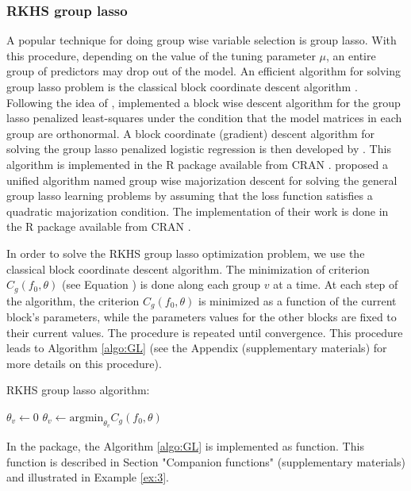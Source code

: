 \subsubsection{RKHS group lasso}\label{subsec:optimGL}
A popular technique for doing group wise variable selection is group lasso. With this procedure, depending on the value of the tuning parameter $\mu$, an entire group of predictors may drop out of the model. An efficient algorithm for solving group lasso problem is the classical block coordinate descent algorithm \citep{10.1561/2200000016,10.1561/2200000050}. Following the idea of \citet{10.2307/1390712}, \citet{doi:10.1111/j.1467-9868.2005.00532.x} implemented a block wise descent algorithm for the group lasso penalized least-squares under the condition that the model matrices in each group are orthonormal. A block coordinate (gradient) descent algorithm for solving the group lasso penalized logistic regression is then developed by \citet{MeiGeeBue08}. This algorithm is implemented in the R package  available from CRAN \citep{grppkg}. \citet{Yang:2015:FUA:2833490.2833520} proposed a unified algorithm named group wise majorization descent for solving the general group lasso learning problems by assuming that the loss function satisfies a quadratic majorization condition. The implementation of their work is done in the  R package available from CRAN \citep{gglspkg}. 

In order to solve the RKHS group lasso optimization problem, we use the classical block coordinate descent algorithm. The minimization of criterion $C_g(f_0,\theta)$ (see Equation ) is done along each group $v$ at a time. At each step of the algorithm, the criterion $C_g(f_0,\theta)$ is minimized as a function of the current block's parameters, while the parameters values for the other blocks are fixed to their current values. The procedure is repeated until convergence. This procedure leads to Algorithm \ref{algo:GL} (see the Appendix (supplementary materials) for more details on this procedure).
\begin{algorithm}[h!]
\caption{RKHS group lasso algorithm:}\label{algo:GL}
\small{
{\setlength{\tabcolsep}{4pt}
\begin{algorithmic}[1]
\Repeat
      \State $\theta_v\gets 0$
    \Else
      \State$\theta_v\gets\text{argmin}_{\theta_v}C_g(f_0,\theta)$
    \EndIf 
 \EndFor
{}
\end{algorithmic}}}
\end{algorithm}
In the  package, the Algorithm \ref{algo:GL} is implemented as  function. This function is described in Section "Companion functions" (supplementary materials) and illustrated in Example \ref{ex:3}.
